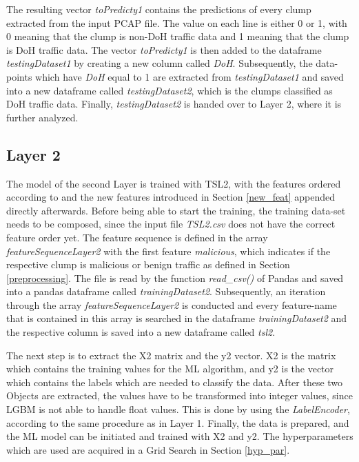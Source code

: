 The resulting vector \textit{toPredicty1} contains the predictions of every clump extracted from the input PCAP file. The value on each line is either 0 or 1, with 0 meaning that the clump is non-DoH traffic data and 1 meaning that the clump is DoH traffic data. The vector \textit{toPredicty1} is then added to the dataframe \textit{testingDataset1} by creating a new column called \textit{DoH}. Subsequently, the data-points which have \textit{DoH} equal to 1 are extracted from \textit{testingDataset1} and saved into a new dataframe called \textit{testingDataset2}, which is the clumps classified as DoH traffic data. Finally, \textit{testingDataset2} is handed over to Layer 2, where it is further analyzed.

\subsection{Layer 2} \label{impl_l2}
The model of the second Layer is trained with TSL2, with the features ordered according to \cite{BehnkeEtAl_FeatureEngineeringMLModelMaliciusDoHTraffic} and the new features introduced in Section \ref{new_feat} appended directly afterwards. Before being able to start the training, the training data-set needs to be composed, since the input file \textit{TSL2.csv} does not have the correct feature order yet. The feature sequence is defined in the array \textit{featureSequenceLayer2} with the first feature \textit{malicious}, which indicates if the respective clump is malicious or benign traffic as defined in Section \ref{preprocessing}. The file is read by the function \textit{read\_csv()} of Pandas and saved into a pandas dataframe called \textit{trainingDataset2}. Subsequently, an iteration through the array \textit{featureSequenceLayer2} is conducted and every feature-name that is contained in this array is searched in the dataframe \textit{trainingDataset2} and the respective column is saved into a new dataframe called \textit{tsl2}.

The next step is to extract the X2 matrix and the y2 vector. X2 is the matrix which contains the training values for the ML algorithm, and y2 is the vector which contains the labels which are needed to classify the data. After these two Objects are extracted, the values have to be transformed into integer values, since LGBM is not able to handle float values. This is done by using the \textit{LabelEncoder}, according to the same procedure as in Layer 1. Finally, the data is prepared, and the ML model can be initiated and trained with X2 and y2. The hyperparameters which are used are acquired in a Grid Search in Section \ref{hyp_par}.

